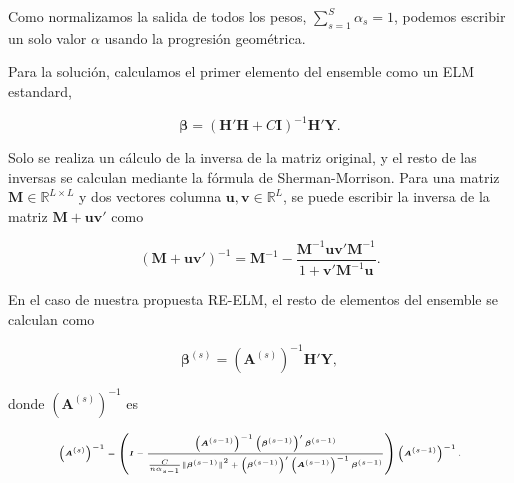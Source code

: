 \documentclass{beamer}
\begin{document}
{	Como normalizamos la salida de todos los pesos, $\sum_{s=1}^S \alpha_s = 1$, podemos escribir un solo valor $\alpha$ usando la progresión geométrica.
	
	 
	 
	 Para la solución, calculamos el primer elemento del ensemble como un ELM estandard,

	 \begin{equation}
	 \label{eq:solucion_elm}
	 \boldsymbol{\beta} = \left( \boldsymbol{H}' \boldsymbol{H} + C \boldsymbol{I} \right)^{-1} \boldsymbol{H}' \boldsymbol{Y}.
	 \end{equation}
	 
	 Solo se realiza un cálculo de la inversa de la matriz original, y el resto de las inversas se calculan mediante la fórmula de Sherman-Morrison\cite{hager1989updating}. Para una matriz $\boldsymbol{M} \in \mathbb{R}^{L \times L}$ y dos vectores columna $\boldsymbol{u}, \boldsymbol{v} \in \mathbb{R}^{L}$, se puede escribir la inversa de la matriz $\boldsymbol{M} + \boldsymbol{u} \boldsymbol{v}'$ como
	 
	 \begin{equation}
	 \label{eq:sherman-morrison}
	 {\left( \boldsymbol{M} + \boldsymbol{u} \boldsymbol{v}' \right)}^{-1} = \boldsymbol{M}^{-1} - \frac{\boldsymbol{M}^{-1} \boldsymbol{u} \boldsymbol{v}' \boldsymbol{M}^{-1}}{1 + \boldsymbol{v}' \boldsymbol{M}^{-1} \boldsymbol{u} }.
	 \end{equation}
	 
	 En el caso de nuestra propuesta RE-ELM, el resto de elementos del ensemble se calculan como
	 
	 
	 \begin{equation}
	 \boldsymbol{\beta}^{(s)} = \left(\boldsymbol{A}^{(s)}\right)^{-1}\boldsymbol{H}'\boldsymbol{Y},
	 \end{equation}
	 
	 donde $\left(\boldsymbol{A}^{(s)}\right)^{-1}$ es
	 
	 \begin{equation}
	 \tiny
\left(\boldsymbol{A}^{(s)}\right)^{-1} =
\left(\boldsymbol{I} - \frac{ \left(\boldsymbol{A}^{(s-1)}\right)^{-1}  \left(\boldsymbol{\beta}^{(s-1)} \right)'\boldsymbol{\beta}^{(s-1)}}{{ \frac{C}{n \alpha_{s-1}} \lVert \boldsymbol{\beta}^{(s-1)} \rVert}^{2} + \left(\boldsymbol{\beta}^{(s-1)} \right)' \left(\boldsymbol{A}^{(s-1)}\right)^{-1} \boldsymbol{\beta}^{(s-1)}}   \right)\left(\boldsymbol{A}^{(s-1)}\right)^{-1}.
\end{equation}



%

}
\end{document}
